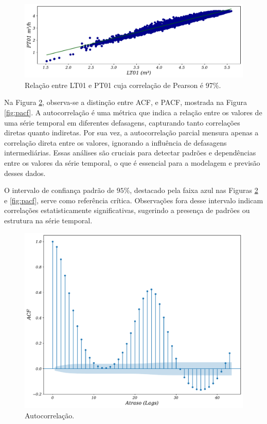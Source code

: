 \begin{figure}[!htb]
	\centering
	\caption{Relação entre LT01 e PT01 cuja correlação de Pearson é 97\%.}
	\label{fig:lr-lt01-m3}
	\includegraphics[width=0.7\linewidth]{Resultados/Figuras/LR}
\end{figure}


Na Figura \ref{fig:acfa}, observa-se a distinção entre ACF, e PACF, mostrada na Figura \ref{fig:pacf}. A autocorrelação é uma métrica que indica a relação entre os valores de uma série temporal em diferentes defasagens, capturando tanto correlações diretas quanto indiretas. Por sua vez, a autocorrelação parcial mensura apenas a correlação direta entre os valores, ignorando a influência de defasagens intermediárias. Essas análises são cruciais para detectar padrões e dependências entre os valores da série temporal, o que é essencial para a modelagem e previsão desses dados.

O intervalo de confiança padrão de $95\%$, destacado pela faixa azul nas Figuras \ref{fig:acfa} e \ref{fig:pacf}, serve como referência crítica. Observações fora desse intervalo indicam correlações estatisticamente significativas, sugerindo a presença de padrões ou estrutura na série temporal.


\begin{figure}[!htb]
	\centering
	\caption{Autocorrelação.}\label{fig:acfa}	\includegraphics[width=0.6\linewidth]{Resultados/Figuras/acf} 
\end{figure}

